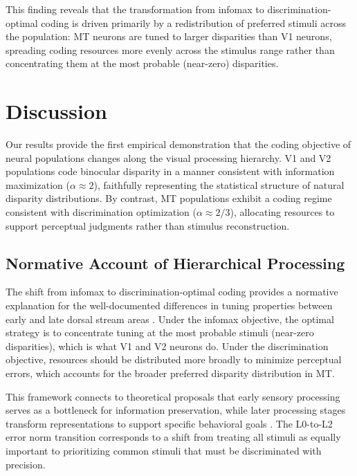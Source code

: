\documentclass[12pt]{article}
\begin{document}
This finding reveals that the transformation from infomax to discrimination-optimal coding is driven primarily by a redistribution of preferred stimuli across the population: MT neurons are tuned to larger disparities than V1 neurons, spreading coding resources more evenly across the stimulus range rather than concentrating them at the most probable (near-zero) disparities.

\section{Discussion}

Our results provide the first empirical demonstration that the coding objective of neural populations changes along the visual processing hierarchy. V1 and V2 populations code binocular disparity in a manner consistent with information maximization ($\alpha \approx 2$), faithfully representing the statistical structure of natural disparity distributions. By contrast, MT populations exhibit a coding regime consistent with discrimination optimization ($\alpha \approx 2/3$), allocating resources to support perceptual judgments rather than stimulus reconstruction.

\subsection{Normative Account of Hierarchical Processing}

The shift from infomax to discrimination-optimal coding provides a normative explanation for the well-documented differences in tuning properties between early and late dorsal stream areas \citep{deangelis1998cortical, cumming2001organization}. Under the infomax objective, the optimal strategy is to concentrate tuning at the most probable stimuli (near-zero disparities), which is what V1 and V2 neurons do. Under the discrimination objective, resources should be distributed more broadly to minimize perceptual errors, which accounts for the broader preferred disparity distribution in MT.

This framework connects to theoretical proposals that early sensory processing serves as a bottleneck for information preservation, while later processing stages transform representations to support specific behavioral goals \citep{barlow1961possible, simoncelli2001natural, wei2015bayesian}. The L0-to-L2 error norm transition corresponds to a shift from treating all stimuli as equally important to prioritizing common stimuli that must be discriminated with precision.
\end{document}
